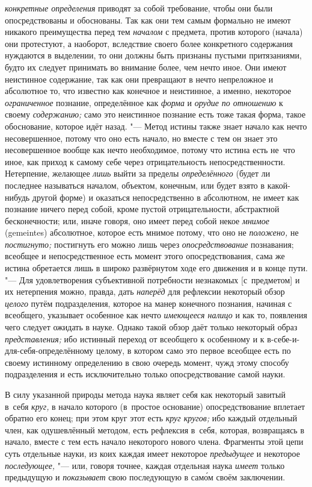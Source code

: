 {\em конкретные определения}
приводят за собой требование, чтобы они были опосредствованы
и обоснованы. Так как они тем самым формально не имеют никакого
преимущества перед тем {\em началом}
с предмета, против которого (начала) они протестуют, а
наоборот, вследствие своего более конкретного содержания нуждаются в
выделении, то они должны быть признаны пустыми притязаниями, будто их
следует принимать во внимание более, чем нечто иное. Они имеют
неистинное содержание, так как они превращают в нечто непреложное и
абсолютное то, что известно как конечное и неистинное, а именно, некоторое
{\em ограниченное} познание, определённое как {\em форма} и {\em орудие}
{\em по отношению} к своему {\em содержанию;}
само это неистинное познание есть тоже такая форма, такое
обоснование, которое идёт назад. "--- Метод истины также знает
начало как нечто несовершенное, потому что оно есть начало, но вместе с тем
он знает это несовершенное вообще как нечто необходимое,
потому что истина есть не~что иное, как приход к самому себе через
отрицательность непосредственности. Нетерпение, желающее
{\em лишь} выйти за пределы {\em определённого}
(будет ли последнее называться началом, объектом, конечным,
или будет взято в какой-нибудь другой форме) и оказаться непосредственно в
абсолютном, не имеет как познание ничего перед собой, кроме пустой
отрицательности, абстрактной бесконечности; или, иначе говоря, оно имеет
перед собой некое {\em мнимое} (gemeintes) абсолютное, которое есть мнимое
потому, что оно не {\em положено,} не {\em постигнуто;}
постигнуть его можно лишь через {\em опосредствование}
познавания; всеобщее и непосредственное есть момент этого
опосредствования, сама же истина обретается лишь в широко развёрнутом ходе
его движения и в конце пути. "--- Для удовлетворения
субъективной потребности незнакомых [с~предметом] и их нетерпения можно,
правда, дать {\em наперёд} для рефлексии некоторый обзор {\em целого} путём
подразделения, которое на манер конечного познания, начиная с всеобщего,
указывает особенное как нечто {\em имеющееся налицо} и
как то, появления чего следует ожидать в науке. Однако такой обзор даёт
только некоторый образ {\em представления;} ибо
истинный переход от всеобщего к особенному и к
в-себе-и-для-себя-определённому целому, в котором само это первое всеобщее
есть по своему истинному определению в свою очередь момент, чужд этому
способу подразделения и есть исключительно только опосредствование самой науки.

В силу указанной природы метода наука являет себя как некоторый завитый в~себя
{\em круг,} в начало которого (в~простое основание) опосредствование вплетает
обратно его конец; при этом круг этот есть {\em круг кругов;} ибо каждый
отдельный член, как одушевлённый методом, есть рефлексия в~себя, которая,
возвращаясь в начало, вместе с тем есть начало некоторого нового члена.
Фрагменты этой цепи суть отдельные науки, из коих каждая имеет некоторое
{\em предыдущее} и некоторое {\em последующее,} "--- или, говоря точнее,
каждая отдельная наука {\em имеет} только предыдущую и {\em показывает}
свою последующую в сам\'{о}м своём заключении.


